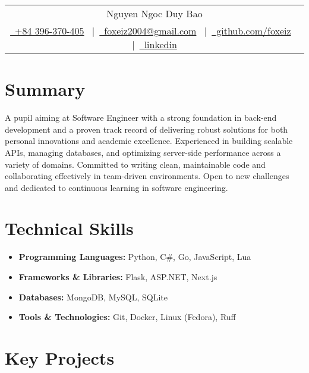 \documentclass[a4paper,12pt]{article}
\begin{document}
\pagestyle{empty}

\begin{tabularx}{\linewidth}{@{} C @{}}
    \Huge{Nguyen Ngoc Duy Bao} \\[7.5pt]
    \href{tel:+84396370405}{\raisebox{-0.05\height}\ +84 396-370-405} \ $|$\
    \href{mailto:foxeiz2004@gmail.com}{\raisebox{-0.05\height}\ foxeiz2004@gmail.com} \ $|$\
    \href{https://github.com/foxeiz}{\raisebox{-0.05\height}\ github.com/foxeiz} \ $|$\
    \href{https://linkedin.com/in/username}{\raisebox{-0.05\height}\ linkedin}
\end{tabularx}


\section{Summary}
A pupil aiming at Software Engineer with a strong foundation in back-end development and a proven track record of delivering robust solutions for both personal innovations and academic excellence. Experienced in building
scalable APIs, managing databases, and optimizing server-side performance across a variety of domains.
Committed to writing clean, maintainable code and collaborating effectively in team-driven environments. Open to new challenges and dedicated to continuous learning in software engineering.

\section{Technical Skills}
\begin{itemize}[nosep,after=\strut, leftmargin=1em, itemsep=4pt, label={}]
    \item \textbf{Programming Languages:} Python, C\#, Go, JavaScript, Lua
    \item \textbf{Frameworks \& Libraries:} Flask, ASP.NET, Next.js
    \item \textbf{Databases:} MongoDB, MySQL, SQLite
    \item \textbf{Tools \& Technologies:} Git, Docker, Linux (Fedora), Ruff
\end{itemize}

\section{Key Projects}
\end{document}

